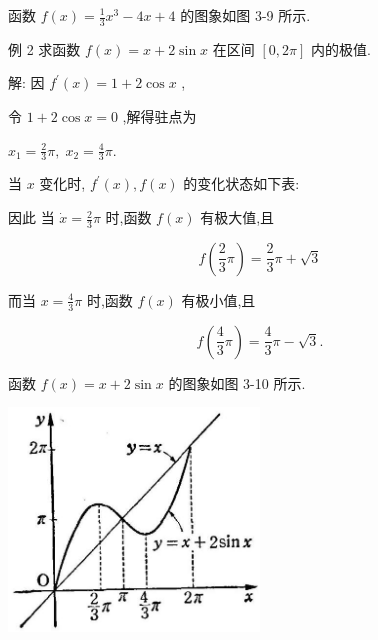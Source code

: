 \documentclass[lang=cn,newtx,10pt,scheme=chinese]{elegantbook}
\begin{document}
函数 \(f\left( x\right) = \frac{1}{3}{x}^{3} - {4x} + 4\) 的图象如图 3-9 所示.

例 2 求函数 \(f\left( x\right) = x + 2\sin x\) 在区间 \(\left\lbrack {0,{2\pi }}\right\rbrack\) 内的极值.

解: 因 \({f}^{\prime }\left( x\right) = 1 + 2\cos x\) ,

令 \(1 + 2\cos x = 0\) ,解得驻点为

\({x}_{1} = \frac{2}{3}\pi ,\;{x}_{2} = \frac{4}{3}\pi .\)

当 \(x\) 变化时, \({f}^{\prime }\left( x\right) ,f\left( x\right)\) 的变化状态如下表:

\begin{center}
\end{center}

因此 当 \(\dot{x} = \frac{2}{3}\pi\) 时,函数 \(f\left( x\right)\) 有极大值,且

\[
f\left( {\frac{2}{3}\pi }\right) = \frac{2}{3}\pi + \sqrt{3}
\]

而当 \(x = \frac{4}{3}\pi\) 时,函数 \(f\left( x\right)\) 有极小值,且

\[
f\left( {\frac{4}{3}\pi }\right) = \frac{4}{3}\pi - \sqrt{3}.
\]

函数 \(f\left( x\right) = x + 2\sin x\) 的图象如图 3-10 所示.

\begin{center}
\includegraphics[max width=0.5\textwidth]{images/01912c18-5c3f-733d-b775-749ba9897a9d_144_191268.jpg}
\end{center}
\end{document}

